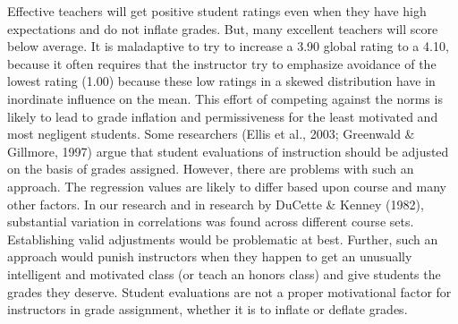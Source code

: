 \documentclass[man]{apa6}
\theoremstyle{definition}
\theoremstyle{definition}
\theoremstyle{definition}
\theoremstyle{remark}
\begin{document}
Effective teachers will get positive student ratings even when they have
high expectations and do not inflate grades. But, many excellent
teachers will score below average. It is maladaptive to try to increase
a 3.90 global rating to a 4.10, because it often requires that the
instructor try to emphasize avoidance of the lowest rating (1.00)
because these low ratings in a skewed distribution have in inordinate
influence on the mean. This effort of competing against the norms is
likely to lead to grade inflation and permissiveness for the least
motivated and most negligent students. Some researchers (Ellis et al.,
2003; Greenwald \& Gillmore, 1997) argue that student evaluations of
instruction should be adjusted on the basis of grades assigned. However,
there are problems with such an approach. The regression values are
likely to differ based upon course and many other factors. In our
research and in research by DuCette \& Kenney (1982), substantial
variation in correlations was found across different course sets.
Establishing valid adjustments would be problematic at best. Further,
such an approach would punish instructors when they happen to get an
unusually intelligent and motivated class (or teach an honors class) and
give students the grades they deserve. Student evaluations are not a
proper motivational factor for instructors in grade assignment, whether
it is to inflate or deflate grades.
\end{document}
